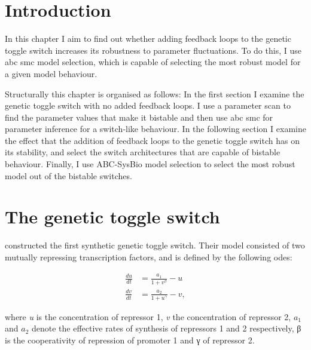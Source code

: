 \section{Introduction}

In this chapter I aim to find out whether adding feedback loops to the genetic toggle switch increases its robustness to parameter fluctuations. To do this, I use \acrshort{abc} \acrshort{smc} model selection, which is capable of selecting the most robust model for a given model behaviour.

Structurally this chapter is organised as follows: In the first section I examine the genetic toggle switch with no added feedback loops. I use a parameter scan to find the parameter values that make it bistable and then use \acrshort{abc} \acrshort{smc} for parameter inference for a switch-like behaviour. In the following section I examine the effect that the addition of feedback loops to the genetic toggle switch has on its stability, and select the switch architectures that are capable of bistable behaviour. Finally, I use ABC-SysBio model selection to select the most robust model out of the bistable switches.




\section{The genetic toggle switch}
\textcite{Gardner:2000vha} constructed the first synthetic genetic toggle switch. Their model consisted of two mutually repressing transcription factors, and is defined by the following \acrshort{ode}s:

\begin{align}\label{eq:gards}
\frac{du}{dt} &= \frac{a_1}{1+v^{\beta}} - u \\
\frac{dv}{dt} &= \frac{a_2}{1+u^{\gamma }} - v,
\end{align}

\noindent where \textit{u} is the concentration of repressor 1, \textit{v} the concentration of repressor 2, $a_1$ and $a_2$ denote the effective rates of synthesis of repressors 1 and 2 respectively, β is the cooperativity of repression of promoter 1 and γ of repressor 2. 

